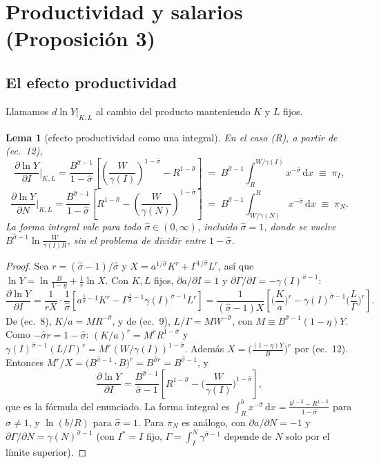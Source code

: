 \documentclass[11pt,a4paper]{article}
\theoremstyle{definition}
\theoremstyle{plain}
\newtheorem{lema}[definicion]{Lema}
\theoremstyle{remark}
\numberwithin{equation}{section}
\newcommand{\sh}{\hat\sigma}
\newcommand{\Is}{I^{*}}
\newcommand{\dd}{\,\mathrm{d}}
\begin{document}
\section{Productividad y salarios (Proposición 3)}\label{sec:prop3}

\subsection{El efecto productividad}
Llamamos $d\ln Y|_{K,L}$ al cambio del producto manteniendo $K$ y $L$ fijos.

\begin{lema}[efecto productividad como una integral]\label{lem:prod}
En el caso (R), a partir de (ec.~12),
\[
  \frac{\partial\ln Y}{\partial I}\Big|_{K,L}
  =\frac{B^{\sh-1}}{1-\sh}\left[\left(\frac{W}{\gamma(I)}\right)^{1-\sh}-R^{1-\sh}\right]
  \;=\;B^{\sh-1}\int_{R}^{W/\gamma(I)}x^{-\sh}\dd x\;\equiv\;\pi_I ,
\]
\[
  \frac{\partial\ln Y}{\partial N}\Big|_{K,L}
  =\frac{B^{\sh-1}}{1-\sh}\left[R^{1-\sh}-\left(\frac{W}{\gamma(N)}\right)^{1-\sh}\right]
  \;=\;B^{\sh-1}\int_{W/\gamma(N)}^{R}x^{-\sh}\dd x\;\equiv\;\pi_N .
\]
La forma integral vale para todo $\sh\in(0,\infty)$, \emph{incluido $\sh=1$}, donde se vuelve
$B^{\sh-1}\ln\frac{W}{\gamma(I)R}$, sin el problema de dividir entre $1-\sh$.
\end{lema}
\begin{proof}
Sea $r=(\sh-1)/\sh$ y $X=a^{1/\sh}K^{r}+\Gamma^{1/\sh}L^{r}$, así que $\ln Y=\ln\frac{B}{1-\eta}+\frac{1}{r}\ln X$.
Con $K,L$ fijos, $\partial a/\partial I=1$ y $\partial\Gamma/\partial I=-\gamma(I)^{\sh-1}$:
\[
  \frac{\partial\ln Y}{\partial I}=\frac{1}{rX}\cdot\frac1\sh\left[a^{\frac1\sh-1}K^{r}-\Gamma^{\frac1\sh-1}\gamma(I)^{\sh-1}L^{r}\right]
  =\frac{1}{(\sh-1)X}\left[\Big(\frac{K}{a}\Big)^{r}-\gamma(I)^{\sh-1}\Big(\frac{L}{\Gamma}\Big)^{r}\right].
\]
De (ec.~8), $K/a=MR^{-\sh}$, y de (ec.~9), $L/\Gamma=MW^{-\sh}$, con $M\equiv B^{\sh-1}(1-\eta)Y$. Como $-\sh r=1-\sh$:
$(K/a)^r=M^rR^{1-\sh}$ y $\gamma(I)^{\sh-1}(L/\Gamma)^r=M^r(W/\gamma(I))^{1-\sh}$. Además
$X=\big(\frac{(1-\eta)Y}{B}\big)^{r}$ por (ec.~12). Entonces
$M^r/X=\big(B^{\sh-1}\cdot B\big)^{r}=B^{\sh r}=B^{\sh-1}$, y
\[
  \frac{\partial\ln Y}{\partial I}=\frac{B^{\sh-1}}{\sh-1}\left[R^{1-\sh}-\Big(\frac{W}{\gamma(I)}\Big)^{1-\sh}\right],
\]
que es la fórmula del enunciado. La forma integral es $\int_R^{b}x^{-\sh}\dd x=\frac{b^{1-\sh}-R^{1-\sh}}{1-\sh}$ para
$\sh\ne1$, y $\ln(b/R)$ para $\sh=1$. Para $\pi_N$ es análogo, con $\partial a/\partial N=-1$ y
$\partial\Gamma/\partial N=\gamma(N)^{\sh-1}$ (con $\Is=I$ fijo, $\Gamma=\int_I^N\gamma^{\sh-1}$ depende de $N$ solo por el límite superior).
\end{proof}
\end{document}
